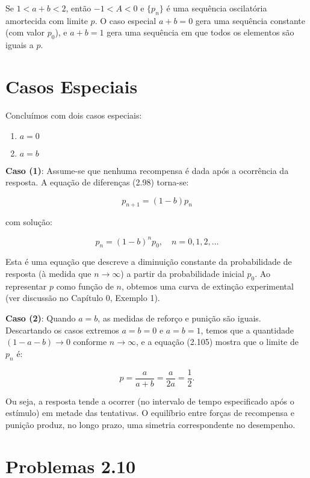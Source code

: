 \documentclass{article}
\begin{document}
Se $1 < a + b < 2$, então $-1 < A < 0$ e $\{p_n\}$ é uma sequência oscilatória amortecida com limite $p$. O caso especial $a + b = 0$ gera uma sequência constante (com valor $p_0$), e $a + b = 1$ gera uma sequência em que todos os elementos são iguais a $p$.

\section*{Casos Especiais}

Concluímos com dois casos especiais:
\begin{enumerate}
  \item $a = 0$
  \item $a = b$
\end{enumerate}

\textbf{Caso (1)}: Assume-se que nenhuma recompensa é dada após a ocorrência da resposta. A equação de diferenças (2.98) torna-se:

\begin{equation}
p_{n+1} = (1 - b)p_n
\end{equation}

com solução:

\begin{equation}
p_n = (1 - b)^n p_0, \quad n = 0, 1, 2, \ldots
\end{equation}

Esta é uma equação que descreve a diminuição constante da probabilidade de resposta (à medida que $n \to \infty$) a partir da probabilidade inicial $p_0$. Ao representar $p$ como função de $n$, obtemos uma curva de extinção experimental (ver discussão no Capítulo 0, Exemplo 1).

\textbf{Caso (2)}: Quando $a = b$, as medidas de reforço e punição são iguais. Descartando os casos extremos $a = b = 0$ e $a = b = 1$, temos que a quantidade $(1 - a - b) \to 0$ conforme $n \to \infty$, e a equação (2.105) mostra que o limite de $p_n$ é:

\[
p = \frac{a}{a + b} = \frac{a}{2a} = \frac{1}{2}.
\]

Ou seja, a resposta tende a ocorrer (no intervalo de tempo especificado após o estímulo) em metade das tentativas. O equilíbrio entre forças de recompensa e punição produz, no longo prazo, uma simetria correspondente no desempenho.

\vspace{1em}

\section*{Problemas 2.10}
\end{document}

